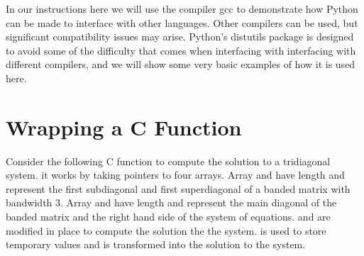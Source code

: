 In our instructions here we will use the compiler gcc to demonstrate how Python can be made to interface with other languages.
Other compilers can be used, but significant compatibility issues may arise.
Python's distutils package is designed to avoid some of the difficulty that comes when interfacing with interfacing with different compilers, and we will show some very basic examples of how it is used here.

\section*{Wrapping a C Function}

Consider the following C function to compute the solution to a tridiagonal system.
it works by taking pointers to four arrays.
Array  and  have length  and represent the first subdiagonal and first superdiagonal of a banded matrix with bandwidth 3.
Array  and  have length and represent the main diagonal of the banded matrix and the right hand side of the system of equations.
 and  are modified in place to compute the solution the the system.
 is used to store temporary values and  is transformed into the solution to the system.



